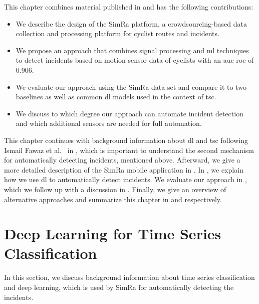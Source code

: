 This chapter combines material published in \cite{karakaya2020simra,karakaya2023cyclesense} and has the following contributions:
\begin{itemize}
\item We describe the design of the SimRa platform, a crowdsourcing-based data collection and processing platform for cyclist routes and incidents.
\item We propose an approach that combines signal processing and \ac{ml} techniques to detect incidents based on motion sensor data of cyclists with an \ac{auc} \ac{roc} of 0.906.
\item We evaluate our approach using the SimRa data set and compare it to two baselines as well as common \acl{dl} models used in the context of \acl{tsc}.
\item We discuss to which degree our approach can automate incident detection and which additional sensors are needed for full automation.
\end{itemize}

This chapter continues with background information about \ac{dl} and \ac{tsc} following Ismail Fawaz et al.~\cite{ismail2019deep} in , which is important to understand the second mechanism for automatically detecting incidents, mentioned above.
Afterward, we give a more detailed description of the SimRa mobile application in .
In , we explain how we use \ac{dl} to automatically detect incidents.
We evaluate our approach in , which we follow up with a discussion in .
Finally, we give an overview of alternative approaches and summarize this chapter in  and  respectively.

\section{Deep Learning for Time Series Classification}
\label{sec:deep_learning_background}
In this section, we discuss background information about time series classification and deep learning, which is used by SimRa for automatically detecting the incidents.

